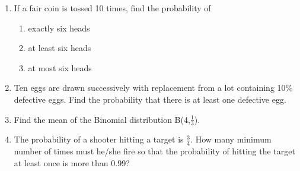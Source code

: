 \begin{enumerate}[label=\thesection.\arabic*.,ref=\thesection.\theenumi]
\item If a fair coin is tossed 10 times, find the probability of
\begin{enumerate}
\item  exactly six heads
\item  at least six heads
\item  at most six  heads
\end{enumerate}
\solution


\item Ten eggs are drawn successively with replacement from a lot containing 10$\%$ defective eggs. Find the probability that there is at least one defective egg.\\
\solution


\item Find the mean of the Binomial distribution B(4,$\frac{1}{3}$).
\\
\solution


\item The probability of a shooter hitting a target is $\frac{3}{4}$. How many minimum
number of times must he/she fire so that the probability of hitting the target at least
once is more than 0.99?
\\
\solution



\end{enumerate}
